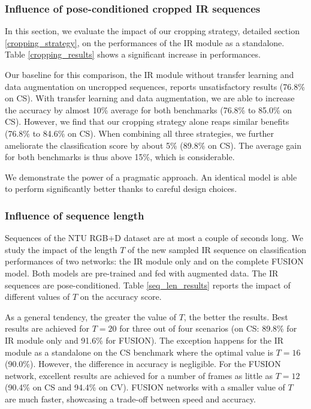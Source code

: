 \documentclass[letterpaper, 10 pt, conference]{ieeeconf}
\begin{document}
\subsubsection{Influence of pose-conditioned cropped IR sequences}

In this section, we evaluate the impact of our cropping strategy, detailed section \ref{cropping_strategy}, on the performances of the IR module as a standalone. Table \ref{cropping_results} shows a significant increase in performances. 

Our baseline for this comparison, the IR module without transfer learning and data augmentation on uncropped sequences, reports unsatisfactory results (76.8\% on CS). With transfer learning and data augmentation, we are able to increase the accuracy by almost 10\% average for both benchmarks (76.8\% to 85.0\% on CS). However, we find that our cropping strategy alone reaps similar benefits (76.8\% to 84.6\% on CS). When combining all three strategies, we further ameliorate the classification score by about 5\% (89.8\% on CS). The average gain for both benchmarks is thus above 15\%, which is considerable.

We demonstrate the power of a pragmatic approach. An identical model is able to perform significantly better thanks to careful design choices.

\subsubsection{Influence of sequence length}

Sequences of the NTU RGB+D dataset are at most a couple of seconds long. We study the impact of the length $T$ of the new sampled IR sequence on classification performances of two networks: the IR module only and on the complete FUSION model. Both models are pre-trained and fed with augmented data. The IR sequences are pose-conditioned. Table \ref{seq_len_results} reports the impact of different values of $T$ on the accuracy score. 

As a general tendency, the greater the value of $T$, the better the results. Best results are achieved for $T=20$ for three out of four scenarios (on CS: 89.8\% for IR module only and 91.6\% for FUSION). The exception happens for the IR module as a standalone on the CS benchmark where the optimal value is $T=16$ (90.0\%). However, the difference in accuracy is negligible. For the FUSION network, excellent results are achieved for a number of frames as little as $T=12$ (90.4\% on CS and 94.4\% on CV). FUSION networks with a smaller value of $T$ are much faster, showcasing a trade-off between speed and accuracy. 
\end{document}
